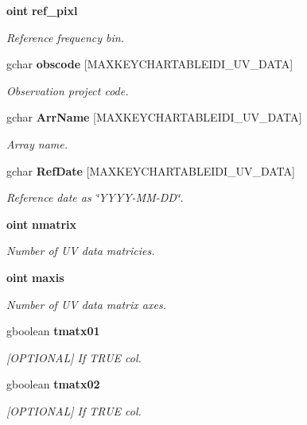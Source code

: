 \begin{CompactItemize}
{\bf oint} {\bf ref\_\-pixl}
\begin{CompactList}\small\item\em Reference frequency bin. \item\end{CompactList}\item 
gchar {\bf obscode} [MAXKEYCHARTABLEIDI\_\-UV\_\-DATA]
\begin{CompactList}\small\item\em Observation project code. \item\end{CompactList}\item 
gchar {\bf Arr\-Name} [MAXKEYCHARTABLEIDI\_\-UV\_\-DATA]
\begin{CompactList}\small\item\em Array name. \item\end{CompactList}\item 
gchar {\bf Ref\-Date} [MAXKEYCHARTABLEIDI\_\-UV\_\-DATA]
\begin{CompactList}\small\item\em Reference date as \char`\"{}YYYY-MM-DD\char`\"{}. \item\end{CompactList}\item 
{\bf oint} {\bf nmatrix}
\begin{CompactList}\small\item\em Number of UV data matricies. \item\end{CompactList}\item 
{\bf oint} {\bf maxis}
\begin{CompactList}\small\item\em Number of UV data matrix axes. \item\end{CompactList}\item 
gboolean {\bf tmatx01}
\begin{CompactList}\small\item\em [OPTIONAL] If TRUE col. \item\end{CompactList}\item 
gboolean {\bf tmatx02}
\begin{CompactList}\small\item\em [OPTIONAL] If TRUE col. \item\end{CompactList}\item 

\end{CompactItemize}
